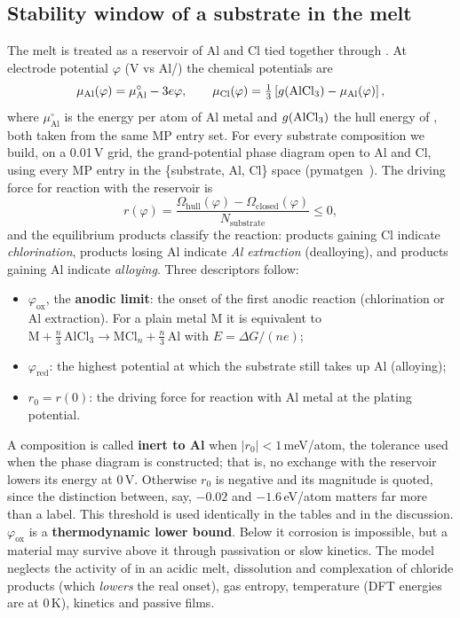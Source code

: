 \documentclass{report}
\newcommand{\phiox}{\varphi_{\mathrm{ox}}}
\newcommand{\phired}{\varphi_{\mathrm{red}}}
\begin{document}
\subsection{Stability window of a substrate in the melt}
\label{sec:window}
The melt is treated as a reservoir of Al and Cl tied together through . At electrode potential $\varphi$ (V vs Al/) the chemical potentials are
\begin{equation}
\mu_{\mathrm{Al}}(\varphi) = \mu^{\circ}_{\mathrm{Al}} - 3e\varphi, \qquad
\mu_{\mathrm{Cl}}(\varphi) = \tfrac{1}{3}\left[g(\ce{AlCl3}) - \mu_{\mathrm{Al}}(\varphi)\right],
\label{eq:mu}
\end{equation}
where $\mu^{\circ}_{\mathrm{Al}}$ is the energy per atom of Al metal and $g(\ce{AlCl3})$ the hull energy of , both taken from the same MP entry set. For every substrate composition we build, on a 0.01\,V grid, the grand-potential phase diagram open to Al and Cl, using every MP entry in the \{substrate, Al, Cl\} space (pymatgen~\citep{Ong2013}). The driving force for reaction with the reservoir is
\begin{equation}
r(\varphi) = \frac{\Omega_{\mathrm{hull}}(\varphi) - \Omega_{\mathrm{closed}}(\varphi)}{N_{\mathrm{substrate}}} \le 0 ,
\end{equation}
and the equilibrium products classify the reaction: products gaining Cl indicate \emph{chlorination}, products losing Al indicate \emph{Al extraction} (dealloying), and products gaining Al indicate \emph{alloying}. Three descriptors follow:
\begin{itemize}[leftmargin=*,itemsep=1pt]
\item $\phiox$, the \textbf{anodic limit}: the onset of the first anodic reaction (chlorination or Al extraction). For a plain metal M it is equivalent to $\mathrm{M} + \tfrac{n}{3}\,\mathrm{AlCl_3} \rightarrow \mathrm{MCl}_n + \tfrac{n}{3}\,\mathrm{Al}$ with $E = \Delta G/(ne)$;
\item $\phired$: the highest potential at which the substrate still takes up Al (alloying);
\item $r_0 = r(0)$: the driving force for reaction with Al metal at the plating potential.
\end{itemize}
A composition is called \textbf{inert to Al} when $|r_0| < 1$\,meV/atom, the tolerance used when the phase diagram is constructed; that is, no exchange with the reservoir lowers its energy at 0\,V. Otherwise $r_0$ is negative and its magnitude is quoted, since the distinction between, say, $-0.02$ and $-1.6$\,eV/atom matters far more than a label. This threshold is used identically in the tables and in the discussion.
$\phiox$ is a \textbf{thermodynamic lower bound}. Below it corrosion is impossible, but a material may survive above it through passivation or slow kinetics. The model neglects the activity of  in an acidic melt, dissolution and complexation of chloride products (which \emph{lowers} the real onset), gas entropy, temperature (DFT energies are at 0\,K), kinetics and passive films.
\end{document}
